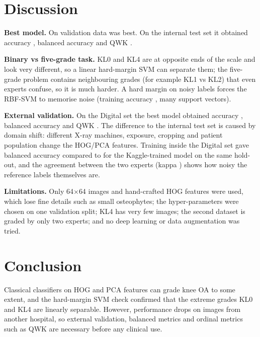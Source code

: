 \documentclass[11pt,a4paper]{article}
\begin{document}
\begin{table}[H]\centering

\caption{Best model on the same 30\,\% Digital hold-out: trained on Kaggle (external) vs trained within Digital.}
\label{tab:transfer}
\end{table}

\section{Discussion}
\textbf{Best model.} On validation data \bestModel{} was best. On the internal test set it obtained accuracy \bestKagAcc{},
balanced accuracy \bestKagBA{} and QWK \bestKagQWK{}.

\textbf{Binary vs five-grade task.} KL0 and KL4 are at opposite ends of the scale and look very different, so a
linear hard-margin SVM can separate them; the five-grade problem contains neighbouring grades (for example KL1 vs KL2)
that even experts confuse, so it is much harder. A hard margin on noisy labels forces the RBF-SVM to memorise noise
(training accuracy \rbfTrainAcc{}, many support vectors).

\textbf{External validation.} On the Digital set the best model obtained accuracy \bestDigAcc{}, balanced accuracy
\bestDigBA{} and QWK \bestDigQWK{}. The difference to the internal test set is caused by domain shift: different
X-ray machines, exposure, cropping and patient population change the HOG/PCA features. Training inside the
Digital set gave balanced accuracy \inDomBA{} compared to \transBA{} for the Kaggle-trained model on the same hold-out,
and the agreement between the two experts (kappa \kappaExperts{}) shows how noisy the reference labels themselves are.

\textbf{Limitations.} Only 64$\times$64 images and hand-crafted HOG features were used, which lose fine details such
as small osteophytes; the hyper-parameters were chosen on one validation split; KL4 has very few images; the second
dataset is graded by only two experts; and no deep learning or data augmentation was tried.

\section{Conclusion}
Classical classifiers on HOG and PCA features can grade knee OA to some extent, and the hard-margin SVM
check confirmed that the extreme grades KL0 and KL4 are linearly separable. However, performance drops on images from another
hospital, so external validation, balanced metrics and ordinal metrics such as QWK are necessary before any clinical use.
\end{document}
